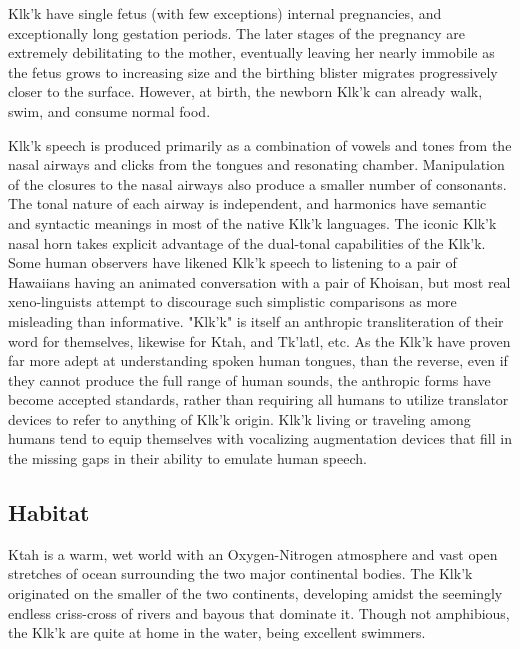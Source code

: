 Klk'k have single fetus (with few exceptions) internal pregnancies,
and exceptionally long gestation periods. The later stages of the
pregnancy are extremely debilitating to the mother, eventually leaving
her nearly immobile as the fetus grows to increasing size and the
birthing blister migrates progressively closer to the
surface. However, at birth, the newborn Klk'k can already walk, swim,
and consume normal food.

Klk'k speech is produced primarily as a combination of vowels and
tones from the nasal airways and clicks from the tongues and
resonating chamber. Manipulation of the closures to the nasal airways
also produce a smaller number of consonants. The tonal nature of each
airway is independent, and harmonics have semantic and syntactic
meanings in most of the native Klk'k languages. The iconic Klk'k nasal
horn takes explicit advantage of the dual-tonal capabilities of the
Klk'k. Some human observers have likened Klk'k speech to listening to
a pair of Hawaiians having an animated conversation with a pair of
Khoisan, but most real xeno-linguists attempt to discourage such
simplistic comparisons as more misleading than informative. "Klk'k" is
itself an anthropic transliteration of their word for themselves,
likewise for Ktah, and Tk'latl, etc. As the Klk'k have proven far more
adept at understanding spoken human tongues, than the reverse, even if
they cannot produce the full range of human sounds, the anthropic
forms have become accepted standards, rather than requiring all humans
to utilize translator devices to refer to anything of Klk'k
origin. Klk'k living or traveling among humans tend to equip
themselves with vocalizing augmentation devices that fill in the
missing gaps in their ability to emulate human speech.

\subsection{Habitat}
Ktah is a warm, wet world with an Oxygen-Nitrogen atmosphere and vast
open stretches of ocean surrounding the two major continental
bodies. The Klk'k originated on the smaller of the two continents,
developing amidst the seemingly endless criss-cross of rivers and
bayous that dominate it. Though not amphibious, the Klk'k are quite at
home in the water, being excellent swimmers.

